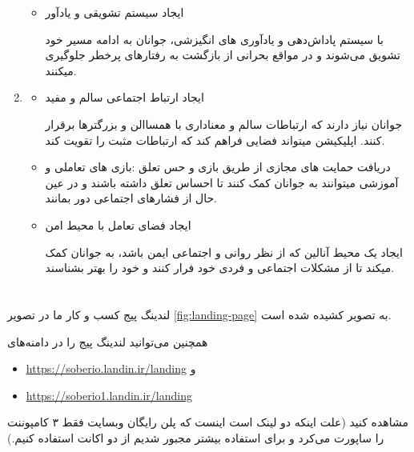 \documentclass[dvipsnames, svgnames, x11names, 11pt]{article}
\begin{document}
\begin{enumerate}
\begin{itemize}
\item 
ایجاد سیستم تشویقی و یادآور

با سیستم پاداش‌دهی و یادآوری های انگیزشی، جوانان به ادامه مسیر خود تشویق می‌شوند و در مواقع بحرانی از بازگشت به رفتارهای پرخطر جلوگیری میکنند.
\end{itemize}

\item  {}

\begin{itemize}
\item 
ایجاد ارتباط اجتماعی سالم و مفید

جوانان نیاز دارند که ارتباطات سالم و معناداری با همساالن و بزرگترها برقرار کنند. اپلیکیشن میتواند فضایی فراهم کند که ارتباطات مثبت را تقویت کند.

\item 
دریافت حمایت های مجازی از طریق بازی و حس تعلق :بازی های تعاملی و آموزشی میتوانند به جوانان کمک کنند تا احساس تعلق داشته باشند و در عین حال از فشارهای اجتماعی دور بمانند.

\item
ایجاد فضای تعامل با محیط امن

ایجاد یک محیط آنالین که از نظر روانی و اجتماعی ایمن باشد، به جوانان کمک میکند تا از مشکلات اجتماعی و فردی خود فرار کنند و خود را بهتر بشناسند.
\end{itemize}
\end{enumerate}

\section{}
لندینگ پیج کسب و کار ما در تصویر 
\ref{fig:landing-page}
به تصویر کشیده شده است.

همچنین می‌توانید لندینگ پیج را در دامنه‌های 
\begin{itemize}
\item \url{https://soberio.landin.ir/landing} و
\item \url{https://soberio1.landin.ir/landing}
\end{itemize}
مشاهده کنید (علت اینکه دو لینک است اینست که پلن رایگان وبسایت فقط ۳ کامپوننت را ساپورت می‌کرد و برای استفاده بیشتر مجبور شدیم از دو اکانت استفاده کنیم.)
\end{document}
